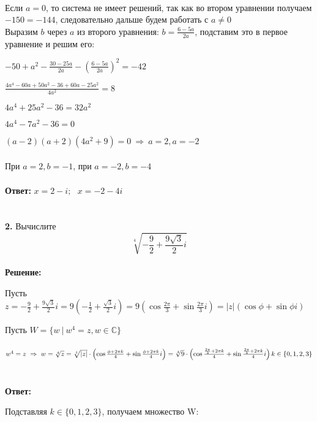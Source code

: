 \documentclass[a4paper, 12pt]{article}
\begin{document}
    \\ Если $a = 0$, то система не имеет решений, так как во втором уравнении получаем $-150 = -144$, следовательно дальше будем работать с $a \neq 0$
    \\ Выразим $b$ через $a$ из второго уравнения: $b = \frac{6 - 5a}{2a}$, подставим это в первое уравнение и решим его:
    \\
    \par $-50 + a^2 - \frac{30 - 25a}{2a} - \left(\frac{6 - 5a}{2a}\right)^2 = -42$
    \\
    \par $\frac{4a^4 - 60a + 50a^2 - 36 + 60a - 25a^2}{4a^2} = 8$
    \\ 
    \par $4a^4 + 25a^2 - 36 = 32a^2$
    \par $4a^4 - 7a^2 - 36 = 0$
    \par $(a - 2)(a + 2)(4a^2 + 9) = 0 \ \Rightarrow \ a = 2, a = -2$
    \\
    \\ При $a = 2, b = -1$, при $a = -2, b = -4$
    \\
    \\ \textbf{Ответ: } $x = 2 - i;\ \ \  x = -2 - 4i$
    \\
    \\
    \\ \textbf{2.} Вычислите
    \[
        \sqrt[4]{-\frac{9}{2} + \frac{9\sqrt{3}}{2}i}
    \]
    \\ \textbf{Решение: }
    \\
    \par Пусть $z = -\frac{9}{2} + \frac{9\sqrt{3}}{2}i = 9\left(-\frac{1}{2} + \frac{\sqrt{3}}{2}i\right) = 9\left(\cos \frac{2\pi}{3} + \sin \frac{2\pi}{3} i\right) = |z|(\cos \phi + \sin \phi i)$
    \\
    \par Пусть $W = \{w \ | \ w^4 = z, w \in \mathbb{C}\}$
    \\
    \\ $w^4 = z \ \Rightarrow \ w = \sqrt[4]{z} = \sqrt[4]{|z|} \cdot \left(\cos \frac{\phi + 2\pi k}{4} + \sin \frac{\phi + 2\pi k}{4} i\right) = \sqrt[4]{9} \cdot \left(\cos \frac{\frac{2 \pi}{3} + 2\pi k}{4} + \sin \frac{\frac{2 \pi}{3} + 2\pi k}{4} i\right) \\ k \in \{0, 1, 2, 3\}$
    \\
    \\
    \\ \textbf{Ответ: }
    \par Подставляя $k \in \{0, 1, 2, 3\}$, получаем множество W: 
\end{document}
